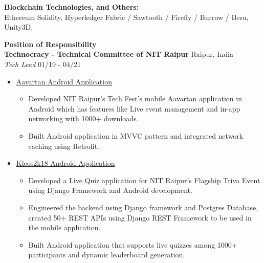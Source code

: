 \documentclass{article}
\begin{document}
\noindent \normalsize \textbf{Blockchain Technologies, and Others:}\\
\noindent \normalsize Ethereum Solidity, Hyperledger Fabric / Sawtooth / Firefly / Burrow / Besu, Unity3D.

\vspace{3pt}
\noindent \large \textbf{\textcolor{NavyBlue}{Position of Responsibility}} \vspace{3pt} \\
\noindent \normalsize \textbf{Technocracy - Technical Committee of NIT Raipur} \hfill Raipur, India \\
\noindent \normalsize \textit{Tech Lead} \hfill 01/19 - 04/21
\begin{itemize}[noitemsep, nolistsep,leftmargin=*]
    \item {\href{https://bit.ly/aavartan}{Aavartan Android Application}
        \begin{itemize}
            \item Developed NIT Raipur's Tech Fest's mobile Aavartan application in Android which has features like Live event management and in-app networking with 1000+ downloads.
            \item Built Android application in MVVC pattern and integrated network caching using Retrofit.
        \end{itemize}
    }
    \item {\href{https://bit.ly/kleos2k18}{Kleos2k18 Android Application}
        \begin{itemize}
            \item Developed a Live Quiz application for NIT Raipur's Flagship Triva Event using Django Framework and Android development.
            \item Engineered the backend using Django framework and Postgres Database, created 50+ REST APIs using Django REST Framework to be used in the mobile application.
            \item Built Android application that supports live quizzes among 1000+ participants and dynamic leaderboard generation.
        \end{itemize}
    }
\end{itemize}
\end{document}
